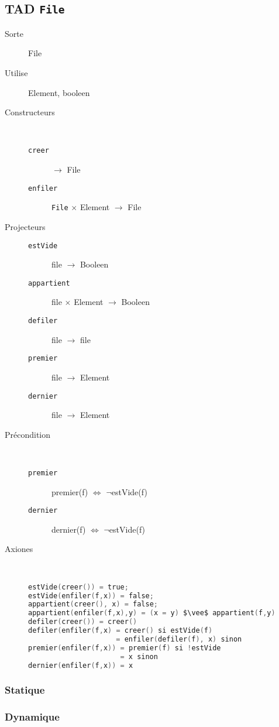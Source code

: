 \subsection{TAD \texttt{File}}
\begin{description}
	\item[Sorte] File
	\item[Utilise] Element, booleen
	\item[Constructeurs]~
		\begin{description}
			\item[\texttt{creer}] $\rightarrow$ File%
			\item[\texttt{enfiler}] \texttt{File} $\times$ Element $\rightarrow$ File
		\end{description}
	\item[Projecteurs] 
		\begin{description}
			\item[\texttt{estVide}] file $\rightarrow$ Booleen
			\item[\texttt{appartient}] file $\times$ Element $\rightarrow$ Booleen
			\item[\texttt{defiler}] file $\rightarrow$ file
			\item[\texttt{premier}] file $\rightarrow$ Element
			\item[\texttt{dernier}] file $\rightarrow$ Element
		\end{description}
	\item[Précondition]~
		\begin{description}
			\item[\texttt{premier}] premier(f) $\Leftrightarrow$ $\neg$estVide(f) 
			\item[\texttt{dernier}] dernier(f) $\Leftrightarrow$ $\neg$estVide(f) 
		\end{description}
	\item[Axiones]~
\begin{lstlisting}[language=C, numbers=none,caption=Axiones du TAD File]
estVide(creer()) = true;
estVide(enfiler(f,x)) = false;
appartient(creer(), x) = false;
appartient(enfiler(f,x),y) = (x = y) $\vee$ appartient(f,y)
defiler(creer()) = creer()
defiler(enfiler(f,x) = creer() si estVide(f)
					 = enfiler(defiler(f), x) sinon
premier(enfiler(f,x)) = premier(f) si !estVide
					  = x sinon
dernier(enfiler(f,x)) = x
\end{lstlisting}
\end{description}
\subsubsection{Statique}


\subsubsection{Dynamique}


